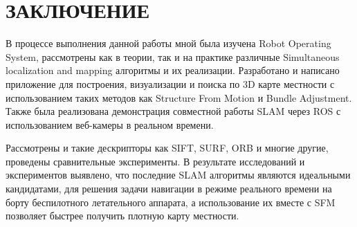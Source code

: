 \chapter*{ЗАКЛЮЧЕНИЕ}

В процессе выполнения данной работы мной была изучена Robot Operating System, рассмотрены как в теории, так и на практике различные Simultaneous localization and mapping алгоритмы и их реализации. Разработано и написано приложение для построения, визуализации и поиска по 3D карте местности с использованием таких методов как Structure From Motion и Bundle Adjustment. Также была реализована демонстрация совместной работы SLAM через ROS с использованием веб-камеры в реальном времени.

Рассмотрены и такие дескрипторы как SIFT, SURF, ORB и многие другие, проведены сравнительные эксперименты. В результате исследований и экспериментов выявлено, что последние SLAM алгоритмы являются идеальными кандидатами, для решения задачи навигации в режиме реального времени на борту беспилотного летательного аппарата, а использование их вместе с SFM позволяет быстрее получить плотную карту местности.
\newpage

